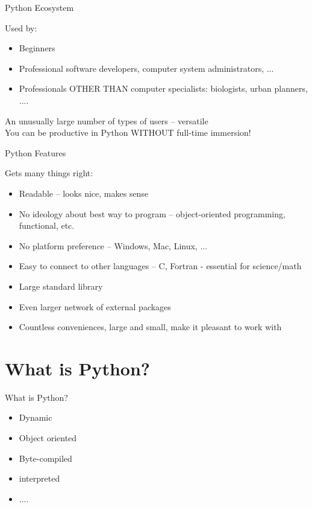 \documentclass{beamer}
\begin{document}
\begin{frame}{Python Ecosystem}

{\Large Used by:} 
\begin{itemize}
  \item Beginners
  \item Professional software developers, computer system administrators, ...  
  \item Professionals OTHER THAN computer specialists: biologists, urban planners, ....
\end{itemize}
\vspace{0.25in}
 An unusually large number of types of users -- versatile\\[0.25in]
 You can be productive in Python WITHOUT full-time immersion!
\end{frame}


\begin{frame}{Python Features}
 
{\Large Gets many things right:}
\begin{itemize}
  \item  Readable -- looks nice, makes sense
  \item  No ideology about best way to program -- 
   object-oriented programming,  functional, etc.
  \item  No platform preference -- Windows, Mac, Linux, ...
  \item  Easy to connect to other languages -- C, Fortran - essential for science/math
  \item  Large standard library 
  \item  Even larger network of external packages
  \item  Countless conveniences, large and small, make it pleasant to work with
\end{itemize}
\end{frame}

\section{What is Python?}

\begin{frame}{What is Python?}
    \begin{itemize}
      \item Dynamic
      \item Object oriented
      \item Byte-compiled
      \item interpreted
      \item ....
    \end{itemize}
\end{frame}
\end{document}

